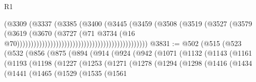 \begin{lexlean}{R1}
\begin{coremodule}
{{{{{{{{{{{{{{{{{{{{{{{{{{{{{{{{{{{{{{{{{{{{{{{{{{{{{{{{{{{{{{{{{{{{{{{{{{{{{{{{{{{{{{{{{{{{{{{{{{{{{{{{{{{{{{{{{{{{{{{{{{{{{{{{{{{{{{{{{{{{{{{{{{{{{{{{{{{{{{{{{{{{{{{{{{{{{{{{{{{{{{{{{{                                                                    (@3309
                                                                      (@3337
                                                                        (@3385
                                                                          (@3400
                                                                            (@3445
                                                                              (@3459
                                                                                (@3508
                                                                                  (@3519
                                                                                    (@3527
                                                                                      (@3579
                                                                                        (@3619
                                                                                          (@3670
                                                                                            (@3727
                                                                                              (@71
                                                                                                @3734
                                                                                                (@16
                                                                                                  @70)))))))))))))))))))))))))))))))))))))))))))))))
@3831 := @502
    (@515
      (@523
        (@532
          (@856
            (@875
              (@894
                (@914
                  (@924
                    (@942
                      (@1071
                        (@1132
                          (@1143
                            (@1161
                              (@1193
                                (@1198
                                  (@1227
                                    (@1253
                                      (@1271
                                        (@1278
                                          (@1294
                                            (@1298
                                              (@1416
                                                (@1434
                                                  (@1441
                                                    (@1465
                                                      (@1529
                                                        (@1535
                                                          (@1561
}}}}}}}}}}}}}}}}}}}}}}}}}}}}}}}}}}}}}}}}}}}}}}}}}}}}}}}}}}}}}}}}}}}}}}}}}}}}}}}}}}}}}}}}}}}}}}}}}}}}}}}}}}}}}}}}}}}}}}}}}}}}}}}}}}}}}}}}}}}}}}}}}}}}}}}}}}}}}}}}}}}}}}}}}}}}}}}}}}}}}}}}}}
\end{coremodule}
\end{lexlean}
